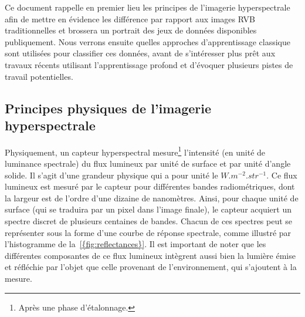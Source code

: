 Ce document rappelle en premier lieu les principes de l'imagerie hyperspectrale afin de mettre en évidence les différence par rapport aux images RVB traditionnelles et brossera un portrait des jeux de données disponibles publiquement. Nous verrons ensuite quelles approches d'apprentissage classique sont utilisées pour classifier ces données, avant de s'intéresser plus prêt aux travaux récents utilisant l'apprentissage profond et d'évoquer plusieurs pistes de travail potentielles.

\subsection{Principes physiques de l'imagerie hyperspectrale}

Physiquement, un capteur hyperspectral mesure\footnote{Après une phase d'étalonnage.} l'intensité (en unité de luminance spectrale) du flux lumineux par unité de surface et par unité d'angle solide. Il s'agit d'une grandeur physique qui a pour unité le $W.m^{-2}.str^{-1}$. Ce flux lumineux est mesuré par le capteur pour différentes bandes radiométriques, dont la largeur est de l'ordre d'une dizaine de nanomètres. Ainsi, pour chaque unité de surface (qui se traduira par un pixel dans l'image finale), le capteur acquiert un spectre discret de plusieurs centaines de bandes. Chacun de ces spectres peut se représenter sous la forme d'une courbe de réponse spectrale, comme illustré par l'histogramme de la~\cref{{fig:reflectances}}. Il est important de noter que les différentes composantes de ce flux lumineux intègrent aussi bien la lumière émise et réfléchie par l'objet que celle provenant de l'environnement, qui s'ajoutent à la mesure.

